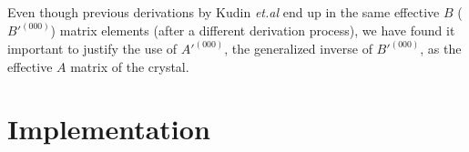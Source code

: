 \documentclass[prl,aps,preprint,superbib,12pt]{revtex4}
\begin{document}
Even though previous derivations by Kudin {\it et.al} \cite{KKudin01} 
end up in the same
effective $B$ ($B'^{(000)}$) matrix elements
(after a different derivation process),
we have found it important to justify the use of
$A'^{(000)}$, the generalized inverse of $B'^{(000)}$, as
the effective $A$ matrix of the crystal.

\section{Implementation}

\end{document}
